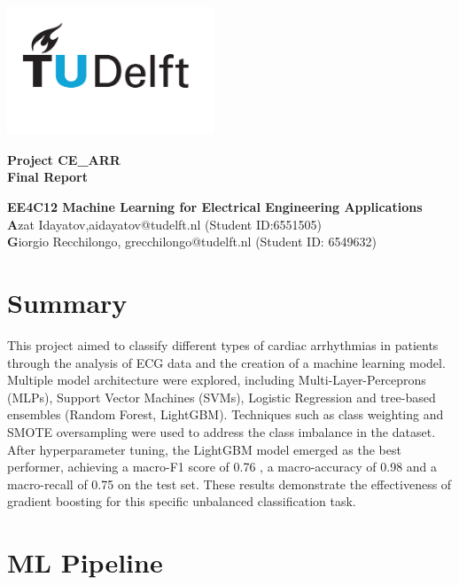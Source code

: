 \documentclass[a4paper,12pt]{article}
\makeatletter
\newcommand{\coursename}{EE4C12 Machine Learning for Electrical Engineering Applications}
\newcommand{\projectname}{Project CE\_ARR }
\newcommand{\reporttype}{Final Report}
\newcommand{\groupmembers}{
\textbf Azat Idayatov,aidayatov@tudelft.nl (Student ID:6551505)\\
\textbf Giorgio Recchilongo, grecchilongo@tudelft.nl (Student ID: 6549632) \\
}
\makeatother
\begin{document}
\begin{titlepage}
\center

\vspace*{-12mm}
\includegraphics[width=62mm]{TUDelft_logo_rgb.png}
\vfill
\vfill

{\fontsize{60}{72}\selectfont\textbf{\projectname}}\\[6mm]{\Large \textbf{\reporttype}}\\

\vfill
\vfill

{\Large \textbf{\coursename}}\\[5mm]




{\large \groupmembers}
\vfill



\end{titlepage}

\section*{Summary}
This project aimed to classify different types of cardiac arrhythmias in patients through the analysis of ECG data and the creation of a machine learning model. \\Multiple model architecture were explored, including Multi-Layer-Perceprons (MLPs), Support Vector Machines (SVMs), Logistic Regression and tree-based ensembles (Random Forest, LightGBM). Techniques such as class weighting and SMOTE oversampling were used to address the class imbalance in the dataset.   \\
After hyperparameter tuning, the LightGBM model emerged as the best performer, achieving a macro-F1  score of 0.76 , a macro-accuracy of 0.98 and a macro-recall of 0.75 on the test set. These results demonstrate the effectiveness of gradient boosting for this specific unbalanced classification task. 


\section*{ML Pipeline}
\end{document}
